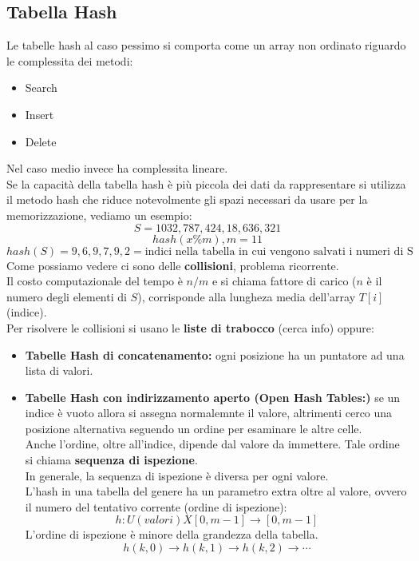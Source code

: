 \documentclass[a4paper,12pt]{article}
\begin{document}
\subsection{Tabella Hash}
Le tabelle hash al caso pessimo si comporta come un array non ordinato riguardo le complessita dei metodi:
\begin{itemize}
    \item Search
    \item Insert
    \item Delete
\end{itemize}
Nel caso medio invece ha complessita lineare.\\
Se la capacità della tabella hash è più piccola dei dati da rappresentare si utilizza il metodo hash che riduce notevolmente gli spazi necessari da usare per la memorizzazione, vediamo un esempio:
\[
S = {1032,787,424,18,636,321}
\]
\[
hash(x \% m), m = 11
\]
\[
hash(S) = {9,6,9,7,9,2} = \text{indici nella tabella in cui vengono salvati i numeri di S}
\]
Come possiamo vedere ci sono delle \textbf{collisioni}, problema ricorrente.\\
Il costo computazionale del tempo è $ n / m$ e si chiama fattore di carico ($n$ è il numero degli elementi di $S$), corrisponde alla lungheza media dell'array $T[i]$ (indice).\\
Per risolvere le collisioni si usano le \textbf{liste di trabocco} (cerca info) oppure:
\begin{itemize}
    \item \textbf{Tabelle Hash di concatenamento:} ogni posizione ha un puntatore ad una lista di valori.
    \item \textbf{Tabelle Hash con indirizzamento aperto (Open Hash Tables:)} se un indice è vuoto allora si assegna normalemnte il valore, altrimenti cerco una posizione alternativa seguendo un ordine per esaminare le altre celle.\\
    Anche l'ordine, oltre all'indice, dipende dal valore da immettere. Tale ordine si chiama \textbf{sequenza di ispezione}.\\
    In generale, la sequenza di ispezione è diversa per ogni valore.\\
    L'hash in una tabella del genere ha un parametro extra oltre al valore, ovvero il numero del tentativo corrente (ordine di ispezione):
    \[
    h: U(valori) X [0,m-1] \to [0,m-1]
    \]
    L'ordine di ispezione è minore della grandezza della tabella.
    \[
    h(k,0) \to h(k,1) \to h(k,2) \to \cdots
    \] 
\end{itemize}
\end{document}
